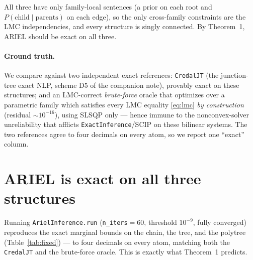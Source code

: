 \documentclass[11pt]{article}
\begin{document}
All three have only family-local sentences (a prior on each root and
$P(\text{child}\mid\text{parents})$ on each edge), so the only cross-family constraints are the LMC
independencies, and every structure is singly connected. By Theorem~1, ARIEL should be exact on all
three.

\paragraph{Ground truth.} We compare against two independent exact references:
\texttt{CredalJT} (the junction-tree exact NLP, scheme D5 of the companion note), provably exact on
these structures; and an LMC-correct \emph{brute-force} oracle that optimizes over a parametric
family which satisfies every LMC equality \eqref{eq:lmc} \emph{by construction} (residual
$\sim\!10^{-16}$), using SLSQP only --- hence immune to the nonconvex-solver unreliability that
afflicts \texttt{ExactInference}/SCIP on these bilinear systems. The two references agree to four
decimals on every atom, so we report one ``exact'' column.

\section{ARIEL is exact on all three structures}\label{sec:singly}

Running \texttt{ArielInference.run} (\texttt{n\_iters}$=60$, threshold $10^{-9}$, fully converged)
reproduces the exact marginal bounds on the chain, the tree, and the polytree
(Table~\ref{tab:fixed}) --- to four decimals on every atom, matching both the \texttt{CredalJT} and
the brute-force oracle. This is exactly what Theorem~1 predicts.
\end{document}
